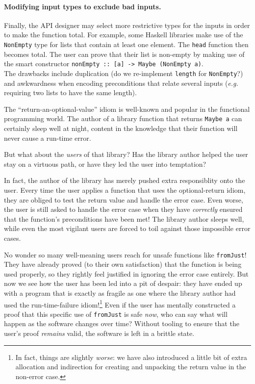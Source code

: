 \documentclass[format=sigplan, review=false, screen=true, 10pt]{acmart}
\makeatletter
\let\origsubsection\subsection
\renewcommand\subsection{\@ifstar{\starsubsection}{\nostarsubsection}}
\newcommand\nostarsubsection[1]
{\subsectionprelude\origsubsection{#1}\subsectionpostlude}
\newcommand\starsubsection[1]
{\subsectionprelude\origsubsection*{#1}\subsectionpostlude}
\newcommand\subsectionprelude{%
  \vspace{-0.25em}
}
\newcommand\subsectionpostlude{%
  \vspace{-0.05em}
}
\makeatother
\begin{document}
\paragraph{Modifying input types to exclude bad inputs.}
Finally, the API designer may select more restrictive types for the inputs in order
to make the function total. For example, some Haskell libraries make use of the
\texttt{NonEmpty} type for lists that contain at least one element. The \texttt{head}
function then becomes total. The user 
can prove that their list is non-empty by making use of the smart constructor
\texttt{nonEmpty :: [a] -> Maybe (NonEmpty a)}.\\
The drawbacks include duplication
(do we re-implement \texttt{length} for \texttt{NonEmpty}?)
and awkwardness when encoding preconditions that relate
several inputs (\textit{e.g.} requiring two lists to have the same length).

\subsection{Leading the user into temptation}
The ``return-an-optional-value'' idiom is well-known and popular in the functional
programming world. The author of a library function that returns \texttt{Maybe a}
can certainly sleep well at night, content in the knowledge that their function
will never cause a run-time error.

But what about the \emph{users} of that library? Has the library author helped the user stay
on a virtuous path, or have they led the user into temptation?

In fact, the author of the library has merely pushed extra responsiblity onto the user.
Every time the user applies a function that uses the optional-return idiom, they are obliged
to test the return value and handle the error case. Even worse, the user is still asked
to handle the error case when they have \emph{correctly} ensured that the function's
preconditions have been met! The library author sleeps well, while even the most vigilant
users are forced to toil against those impossible error cases.

No wonder so many well-meaning users reach for unsafe functions like \texttt{fromJust}!
They have already proved (to their own satisfaction) that the function is being used properly, so they rightly
feel justified in ignoring the error case entirely. But now we see how the user has been led into
a pit of despair: they have ended up with a program that is exactly as fragile as one where the library
author had used the run-time-failure idiom!\footnote{In fact, things are slightly \emph{worse}: we have also introduced a little
bit of extra allocation and indirection for creating and unpacking the return value in the non-error case.}
Even if the user has mentally constructed a proof that this specific use of \texttt{fromJust} is safe \emph{now},
who can say what will
happen as the software changes over time? Without tooling to ensure that the user's proof \emph{remains} valid,
the software is left in a brittle state.
\end{document}
